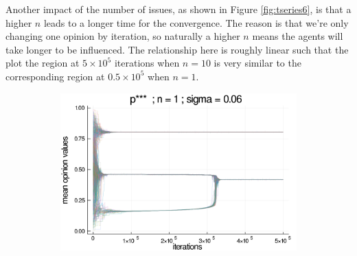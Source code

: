 \documentclass{article}
\begin{document}
    Another impact of the number of issues, as shown in Figure
    \ref{fig:tseries6}, is that a higher \(n\) leads to a longer time for the
    convergence. The reason is that we're only changing one
    opinion by iteration, so naturally a higher \(n\) means the agents will take
    longer to be influenced. The relationship here is roughly linear such that
    the plot the region at \(5 \times 10^5\) iterations when \(n = 10\) is very
    similar to the corresponding region at \(0.5 \times 10^5\) when \(n = 1\).
    
    \begin{figure}[H]
      \centering
      
      \begin{subfigure}[b]{0.49\textwidth}
        \includegraphics[width=\textwidth]{img/series/tseries6/Poodlcalculatep***n1-rho10e-5-sigma006-00intransrandom.png}
      \end{subfigure}
      

\end{figure}
\end{document}
